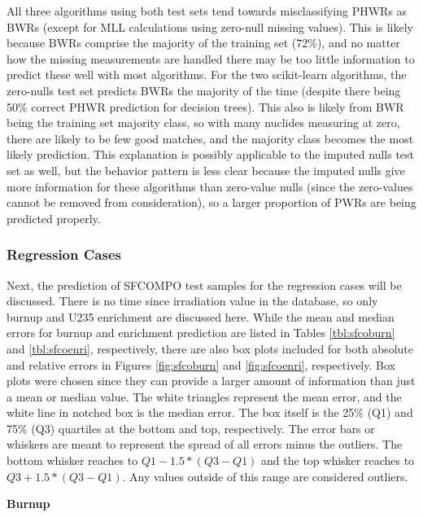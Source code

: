 All three algorithms using both test sets tend towards misclassifying
\gls{PHWR}s as \gls{BWR}s (except for \gls{MLL} calculations using zero-null
missing values).  This is likely because \gls{BWR}s comprise the majority of
the training set (72\%), and no matter how the missing measurements are handled
there may be too little information to predict these well with most algorithms.
For the two scikit-learn algorithms, the zero-nulls test set predicts
\gls{BWR}s the majority of the time (despite there being 50\% correct
\gls{PHWR} prediction for decision trees). This also is likely from \gls{BWR}
being the training set majority class, so with many nuclides measuring at zero,
there are likely to be few good matches, and the majority class becomes the
most likely prediction. This explanation is possibly applicable to the imputed
nulls test set as well, but the behavior pattern is less clear because the
imputed nulls give more information for these algorithms than zero-value nulls
(since the zero-values cannot be removed from consideration), so a larger
proportion of \gls{PWR}s are being predicted properly.  

\subsubsection{Regression Cases}
\label{sec:sfcoreg}

Next, the prediction of \gls{SFCOMPO} test samples for the regression cases
will be discussed. There is no time since irradiation value in the database, so
only burnup and \gls{U235} enrichment are discussed here.  While the mean and
median errors for burnup and enrichment prediction are listed in Tables
\ref{tbl:sfcoburn} and \ref{tbl:sfcoenri}, respectively, there are also box
plots included for both absolute and relative errors in Figures
\ref{fig:sfcoburn} and \ref{fig:sfcoenri}, respectively.  Box plots were chosen
since they can provide a larger amount of information than just a mean or
median value.  The white triangles represent the mean error, and the white line
in notched box is the median error. The box itself is the 25\% (Q1) and 75\%
(Q3) quartiles at the bottom and top, respectively. The error bars or whiskers
are meant to represent the spread of all errors minus the outliers.  The bottom
whisker reaches to $Q1 - 1.5*(Q3-Q1)$ and the top whisker reaches to $Q3 +
1.5*(Q3-Q1)$. Any values outside of this range are considered outliers.
\cite{matplotlib}

\noindent \textbf{Burnup}

